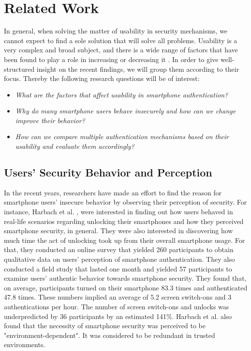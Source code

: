 \section{Related Work} \label{2.2}

In general, when solving the matter of usability in security mechanisms, we cannot expect to find a sole solution that will solve all problems. Usability is a very complex and broad subject, and there is a wide range of factors that have been found to play a role in increasing or decreasing it \cite{Zezschwitz,harbach,Albayram:2017:BUL:3235924.3235929, AnatomySmartphone}. In order to give well-structured insight on the recent findings, we will group them according to their focus. Thereby the following research questions will be of interest: 

\begin{itemize}
    \item \textit{What are the factors that affect usability in smartphone authentication?}
\item \textit{Why do many smartphone users behave insecurely and how can we change improve their behavior?} 
    \item \textit{How can we compare multiple authentication mechanisms based on their usability and evaluate them accordingly?}
\end{itemize}

\subsection{Users' Security Behavior and Perception} \label{2.2.1}

In the recent years, researchers have made an effort to find the reason for smartphone users' insecure behavior by observing their perception of security. For instance, Harbach et al. \cite{harbach}, were interested in finding out how users behaved in real-life scenarios regarding unlocking their smartphones and how they perceived smartphone security, in general. They were also interested in discovering how much time the act of unlocking took up from their overall smartphone usage. For that, they conducted an online survey that yielded 260 participants to obtain qualitative data on users' perception of smartphone authentication. They also conducted a field study that lasted one month and yielded 57 participants to examine users' authentic behavior towards smartphone security. They found that, on average, participants turned on their smartphone 83.3 times and authenticated 47.8 times. These numbers implied an average of 5.2 screen switch-ons and 3 authentications per hour. The number of screen switch-ons and unlocks was underpredicted by 36 participants by an estimated 141\%. Harbach et al. \cite{harbach} also found that the necessity of smartphone security was perceived to be "environment-dependent". It was considered to be redundant in trusted environments.\\

